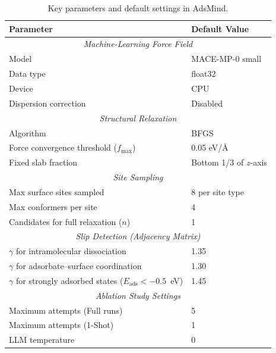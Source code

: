 \documentclass[%
 preprint,
 superscriptaddress,
 amsmath,amssymb,
 aps,
 prb,
 floatfix,
]{revtex4-2}
\begin{document}
\begin{table}[ht]
\centering
\caption{Key parameters and default settings in AdsMind.}
\label{tab:si-parameters}
\begin{tabular}{ll}
\hline
\textbf{Parameter} & \textbf{Default Value} \\
\hline
\multicolumn{2}{c}{\textit{Machine-Learning Force Field}} \\
\hline
Model & MACE-MP-0 small \\
Data type & float32 \\
Device & CPU \\
Dispersion correction & Disabled \\
\hline
\multicolumn{2}{c}{\textit{Structural Relaxation}} \\
\hline
Algorithm & BFGS \\
Force convergence threshold ($f_{\text{max}}$) & 0.05 eV/\AA \\
Fixed slab fraction & Bottom 1/3 of $z$-axis \\
\hline
\multicolumn{2}{c}{\textit{Site Sampling}} \\
\hline
Max surface sites sampled & 8 per site type \\
Max conformers per site & 4 \\
Candidates for full relaxation ($n$) & 1 \\
\hline
\multicolumn{2}{c}{\textit{Slip Detection (Adjacency Matrix)}} \\
\hline
$\gamma$ for intramolecular dissociation & 1.35 \\
$\gamma$ for adsorbate--surface coordination & 1.30 \\
$\gamma$ for strongly adsorbed states ($E_{\text{ads}} < -0.5$~eV) & 1.45 \\
\hline
\multicolumn{2}{c}{\textit{Ablation Study Settings}} \\
\hline
Maximum attempts (Full runs) & 5 \\
Maximum attempts (1-Shot) & 1 \\
LLM temperature & 0 \\
\hline
\end{tabular}
\end{table}


\end{document}
